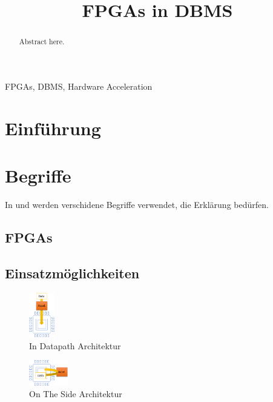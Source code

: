 \documentclass[conference]{IEEEtran}
\begin{document}
\title{FPGAs in DBMS
}

\author{
}

\maketitle

\begin{abstract}
    Abstract here.
\end{abstract}

\begin{IEEEkeywords}
    FPGAs, DBMS, Hardware Acceleration
\end{IEEEkeywords}

\section{Einführung}


\section{Begriffe}
In \cite{li_bitweaving_2013} und \cite{lisa_column_2018} werden verschidene Begriffe verwendet, die Erklärung bedürfen.


\subsection{FPGAs}


\subsection{Einsatzmöglichkeiten}


\begin{figure}[htbp]
    \centering
    \includegraphics[width=0.1\textwidth]{imgs/InDatapath.png}
    \caption{In Datapath Architektur}
    \label{fig:indatapath}
\end{figure}

\begin{figure}[htbp]
    \centering
    \includegraphics[width=0.15\textwidth]{imgs/OnTheSide.png}
    \caption{On The Side Architektur}
    \label{fig:ontheside}
\end{figure}
\end{document}
